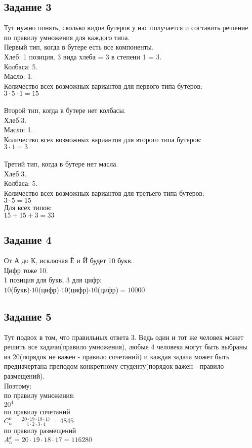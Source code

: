 \documentclass[12pt]{article}
\begin{document}
\subsection{Задание 3}
Тут нужно понять, сколько видов бутеров у нас получается и составить решение по правилу умножения для каждого типа.\\
Первый тип, когда в бутере есть все компоненты.\\
Хлеб: 1 позиция, 3 вида хлеба = 3 в степени 1 = 3.\\
Колбаса: 5.\\
Масло: 1.\\
Количество всех возможных вариантов для первого типа бутеров:\\
 $3\cdot5\cdot1=15$
\\
\\
Второй тип, когда в бутере нет колбасы.\\
Хлеб:3.\\
Масло: 1.\\
Количество всех возможных вариантов для второго типа бутеров:\\
 $3\cdot1=3$
\\
\\
Третий тип, когда в бутере нет масла.\\
Хлеб:3.\\
Колбаса: 5.\\
Количество всех возможных вариантов для третьего типа бутеров:\\
 $3\cdot5=15$
\\
Для всех типов:\\
$15+15+3=33$

\newpage
\subsection{Задание 4}

От А до К, исключая Ё и Й будет 10 букв.\\
Цифр тоже 10. \\
1 позиция для букв, 3 для цифр:\\
$10 $(букв)$\cdot10$(цифр)$\cdot10$(цифр)$\cdot10$(цифр)$ = 10000 $

\newpage
\subsection{Задание 5}

Тут подвох в том, что правильных ответа 3. Ведь один и тот же человек может решить все хадачи(правило умножения), любые 4 человека могут быть выбраны из 20(порядок не важен - правило сочетаний) и каждая задача может быть предначертана преподом конкретному студенту(порядок важен - правило размещений).\\
Поэтому:\\
по правилу умножения:\\
$20^4$\\
по правилу сочетаний\\
$C_n^{k}  = \frac{20\cdot19\cdot18\cdot17}{1\cdot2\cdot3\cdot4} = 4845$\\
по правилу размещений\\
$A_n^{k}  = 20\cdot19\cdot18\cdot17 = 116280$
\end{document}
